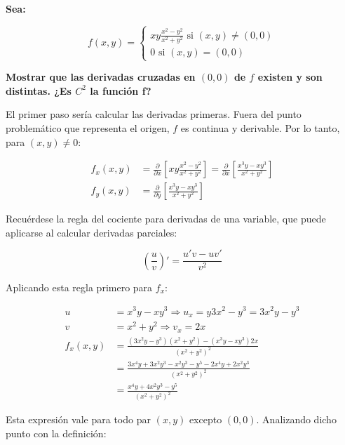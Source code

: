 \documentclass{article}
\begin{document}
\textbf{Sea:}

\begin{equation}
f(x,y) = \left\{ \begin{array}{ll}
xy \frac{x^2 - y^2}{x^2 + y^2} \text{ si } (x,y) \neq (0,0) \\
0 \text{ si } (x,y) = (0,0)
\end{array} \right.
\end{equation}

\textbf{Mostrar que las derivadas cruzadas en $(0,0)$ de $f$ existen y son distintas. ¿Es $C^2$ la función f?}

El primer paso sería calcular las derivadas primeras. Fuera del punto problemático que representa el origen, $f$ es continua y derivable. Por lo tanto, para $(x,y) \neq 0$:

\begin{subequations}
\begin{align}
f_x(x,y) &= \frac{\partial}{\partial x} \left[ xy \frac{x^2 - y^2}{x^2 + y^2} \right] = \frac{\partial}{\partial x} \left[ \frac{x^3y - xy^3}{x^2 + y^2} \right] \\
f_y(x,y) &= \frac{\partial}{\partial y} \left[ \frac{x^3y - xy^3}{x^2 + y^2} \right]
\end{align}
\end{subequations}

Recuérdese la regla del cociente para derivadas de una variable, que puede aplicarse al calcular derivadas parciales:

\begin{equation}
\left( \frac{u}{v} \right)' = \frac{u'v - uv'}{v^2}
\end{equation}

Aplicando esta regla primero para $f_x$:

\begin{subequations}
\begin{align}
u &= x^3 y - xy^3 \Rightarrow u_x = y 3x^2 - y^3 = 3x^2y - y^3 \\
v &= x^2 + y^2 \Rightarrow v_x = 2x \\
f_x(x,y) &= \frac{(3x^2y - y^3)(x^2 + y^2) - (x^3y - xy^3) 2x}{(x^2 + y^2)^2} \\
&= \frac{3x^4y + 3x^2y^3-x^2y^3-y^5-2x^4y+2x^2y^3}{(x^2 + y^2)^2} \\
&= \frac{x^4y+4x^2y^3-y^5}{(x^2 + y^2)^2}
\end{align}
\end{subequations}

Esta expresión vale para todo par $(x,y)$ excepto $(0,0)$. Analizando dicho punto con la definición:
\end{document}
